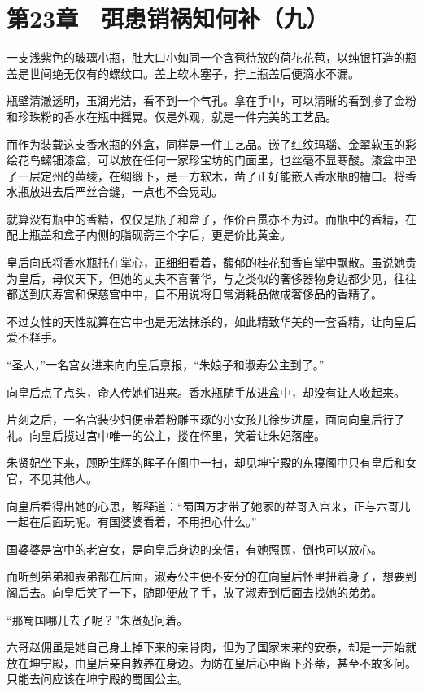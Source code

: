 \section{第23章　弭患销祸知何补（九）}

一支浅紫色的玻璃小瓶，肚大口小如同一个含苞待放的荷花花苞，以纯银打造的瓶盖是世间绝无仅有的螺纹口。盖上软木塞子，拧上瓶盖后便滴水不漏。

瓶壁清澈透明，玉润光洁，看不到一个气孔。拿在手中，可以清晰的看到掺了金粉和珍珠粉的香水在瓶中摇晃。仅是外观，就是一件完美的工艺品。

而作为装载这支香水瓶的外盒，同样是一件工艺品。嵌了红纹玛瑙、金翠软玉的彩绘花鸟螺钿漆盒，可以放在任何一家珍宝坊的门面里，也丝毫不显寒酸。漆盒中垫了一层定州的黄绫，在绸缎下，是一方软木，凿了正好能嵌入香水瓶的槽口。将香水瓶放进去后严丝合缝，一点也不会晃动。

就算没有瓶中的香精，仅仅是瓶子和盒子，作价百贯亦不为过。而瓶中的香精，在配上瓶盖和盒子内侧的脂砚斋三个字后，更是价比黄金。

皇后向氏将香水瓶托在掌心，正细细看着，馥郁的桂花甜香自掌中飘散。虽说她贵为皇后，母仪天下，但她的丈夫不喜奢华，与之类似的奢侈器物身边都少见，往往都送到庆寿宫和保慈宫中中，自不用说将日常消耗品做成奢侈品的香精了。

不过女性的天性就算在宫中也是无法抹杀的，如此精致华美的一套香精，让向皇后爱不释手。

“圣人，”一名宫女进来向向皇后禀报，“朱娘子和淑寿公主到了。”

向皇后点了点头，命人传她们进来。香水瓶随手放进盒中，却没有让人收起来。

片刻之后，一名宫装少妇便带着粉雕玉琢的小女孩儿徐步进屋，面向向皇后行了礼。向皇后揽过宫中唯一的公主，搂在怀里，笑着让朱妃落座。

朱贤妃坐下来，顾盼生辉的眸子在阁中一扫，却见坤宁殿的东寝阁中只有皇后和女官，不见其他人。

向皇后看得出她的心思，解释道：“蜀国方才带了她家的益哥入宫来，正与六哥儿一起在后面玩呢。有国婆婆看着，不用担心什么。”

国婆婆是宫中的老宫女，是向皇后身边的亲信，有她照顾，倒也可以放心。

而听到弟弟和表弟都在后面，淑寿公主便不安分的在向皇后怀里扭着身子，想要到阁后去。向皇后笑了一下，随即便放了手，放了淑寿到后面去找她的弟弟。

“那蜀国哪儿去了呢？”朱贤妃问着。

六哥赵佣虽是她自己身上掉下来的亲骨肉，但为了国家未来的安泰，却是一开始就放在坤宁殿，由皇后亲自教养在身边。为防在皇后心中留下芥蒂，甚至不敢多问。只能去问应该在坤宁殿的蜀国公主。


